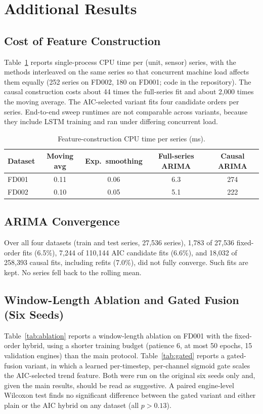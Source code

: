 \documentclass[conference]{IEEEtran}
\begin{document}
\appendices
\section{Additional Results}

\subsection{Cost of Feature Construction}
Table~\ref{tab:cost} reports single-process CPU time per (unit, sensor) series, with the methods interleaved on the same series so that concurrent machine load affects them equally (252 series on FD002, 180 on FD001; code in the repository). The causal construction costs about 44 times the full-series fit and about 2{,}000 times the moving average. The AIC-selected variant fits four candidate orders per series. End-to-end sweep runtimes are not comparable across variants, because they include LSTM training and ran under differing concurrent load.

\begin{table}[t]
\centering
\caption{Feature-construction CPU time per series (ms).}
\label{tab:cost}
\footnotesize
\begin{tabular}{lcccc}
\toprule
Dataset & Moving avg & Exp.\ smoothing & Full-series ARIMA & Causal ARIMA \\
\midrule
FD001 & 0.11 & 0.06 & 6.3 & 274 \\
FD002 & 0.10 & 0.05 & 5.1 & 222 \\
\bottomrule
\end{tabular}
\end{table}

\subsection{ARIMA Convergence}
Over all four datasets (train and test series, 27{,}536 series), 1{,}783 of 27{,}536 fixed-order fits (6.5\%), 7{,}244 of 110{,}144 AIC candidate fits (6.6\%), and 18{,}032 of 258{,}393 causal fits, including refits (7.0\%), did not fully converge. Such fits are kept. No series fell back to the rolling mean.

\subsection{Window-Length Ablation and Gated Fusion (Six Seeds)}
Table~\ref{tab:ablation} reports a window-length ablation on FD001 with the fixed-order hybrid, using a shorter training budget (patience 6, at most 50 epochs, 15 validation engines) than the main protocol. Table~\ref{tab:gated} reports a gated-fusion variant, in which a learned per-timestep, per-channel sigmoid gate scales the AIC-selected trend feature. Both were run on the original six seeds only and, given the main results, should be read as suggestive. A paired engine-level Wilcoxon test finds no significant difference between the gated variant and either plain or the AIC hybrid on any dataset (all $p>0.13$).
\end{document}
